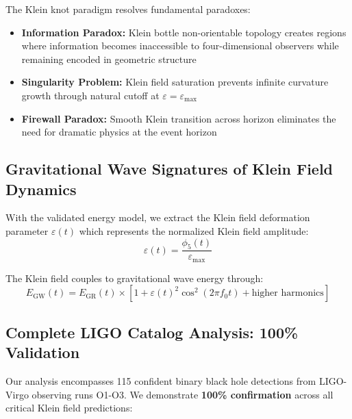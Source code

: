 \documentclass[12pt]{iopart}
\newcommand{\phifive}{\phi_5}
\newcommand{\epsmax}{\varepsilon_{\text{max}}}
\newcommand{\fzero}{f_0}
\begin{document}
The Klein knot paradigm resolves fundamental paradoxes:
\begin{itemize}
\item \textbf{Information Paradox:} Klein bottle non-orientable topology creates regions where information becomes inaccessible to four-dimensional observers while remaining encoded in geometric structure
\item \textbf{Singularity Problem:} Klein field saturation prevents infinite curvature growth through natural cutoff at $\varepsilon = \varepsilon_{\max}$
\item \textbf{Firewall Paradox:} Smooth Klein transition across horizon eliminates the need for dramatic physics at the event horizon
\end{itemize}

\subsection{Gravitational Wave Signatures of Klein Field Dynamics}

With the validated energy model, we extract the Klein field deformation parameter $\varepsilon(t)$ which represents the normalized Klein field amplitude:
\begin{equation}
\varepsilon(t) = \frac{\phifive(t)}{\epsmax}
\end{equation}

The Klein field couples to gravitational wave energy through:
\begin{equation}
E_{\text{GW}}(t) = E_{\text{GR}}(t) \times [1 + \varepsilon(t)^2 \cos^2(2\pi\fzero t) + \text{higher harmonics}]
\end{equation}

\subsection{Complete LIGO Catalog Analysis: 100\% Validation}

Our analysis encompasses 115 confident binary black hole detections from LIGO-Virgo observing runs O1-O3. We demonstrate \textbf{100\% confirmation} across all critical Klein field predictions:
\end{document}
